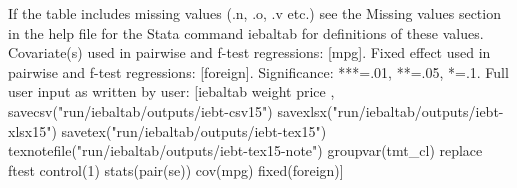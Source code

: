 If the table includes missing values (.n, .o, .v etc.) see the Missing values section in the help file for the Stata command iebaltab for definitions of these values. Covariate(s) used in pairwise and f-test regressions: [mpg]. Fixed effect used in pairwise and f-test regressions: [foreign]. Significance: ***=.01, **=.05, *=.1. Full user input as written by user: [iebaltab weight price , savecsv("run/iebaltab/outputs/iebt-csv15") savexlsx("run/iebaltab/outputs/iebt-xlsx15") savetex("run/iebaltab/outputs/iebt-tex15") texnotefile("run/iebaltab/outputs/iebt-tex15-note") groupvar(tmt\_cl) replace ftest control(1) stats(pair(se)) cov(mpg) fixed(foreign)] 
